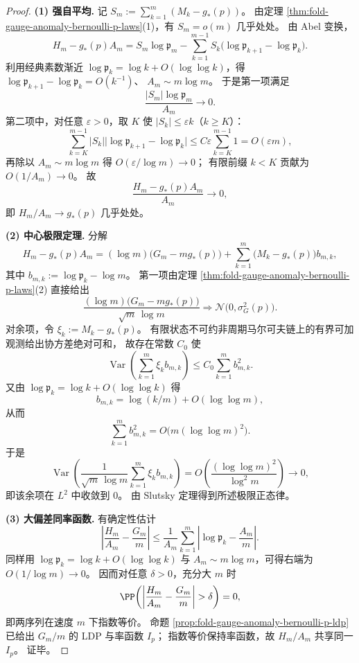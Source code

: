 \begin{proof}
\textbf{(1) 强自平均.}
记
\(
S_m:=\sum_{k=1}^{m}(M_k-g_\ast(p))
\)。
由定理 \ref{thm:fold-gauge-anomaly-bernoulli-p-laws}(1)，有 \(S_m=o(m)\) 几乎处处。
由 Abel 变换，
\[
H_m-g_\ast(p)A_m
=
S_m\log\mathfrak p_m
-\sum_{k=1}^{m-1}S_k\bigl(\log\mathfrak p_{k+1}-\log\mathfrak p_k\bigr).
\]
利用经典素数渐近 \(\log\mathfrak p_k=\log k+O(\log\log k)\)，得
\(
\log\mathfrak p_{k+1}-\log\mathfrak p_k=O(k^{-1})
\)、
\(
A_m\sim m\log m
\)。
于是第一项满足
\[
\frac{|S_m|\log\mathfrak p_m}{A_m}\to 0.
\]
第二项中，对任意 \(\varepsilon>0\)，取 \(K\) 使 \(|S_k|\le \varepsilon k\)（\(k\ge K\)）：
\[
\sum_{k=K}^{m-1}|S_k|\bigl|\log\mathfrak p_{k+1}-\log\mathfrak p_k\bigr|
\le
C\varepsilon\sum_{k=K}^{m-1}1
=
O(\varepsilon m),
\]
再除以 \(A_m\sim m\log m\) 得 \(O(\varepsilon/\log m)\to0\)；
有限前缀 \(k<K\) 贡献为 \(O(1/A_m)\to0\)。
故
\[
\frac{H_m-g_\ast(p)A_m}{A_m}\to0,
\]
即 \(H_m/A_m\to g_\ast(p)\) 几乎处处。
\par
\textbf{(2) 中心极限定理.}
分解
\[
H_m-g_\ast(p)A_m
=
(\log m)\bigl(G_m-mg_\ast(p)\bigr)
+\sum_{k=1}^{m}\bigl(M_k-g_\ast(p)\bigr)b_{m,k},
\]
其中
\(
b_{m,k}:=\log\mathfrak p_k-\log m
\)。
第一项由定理 \ref{thm:fold-gauge-anomaly-bernoulli-p-laws}(2) 直接给出
\[
\frac{(\log m)\bigl(G_m-mg_\ast(p)\bigr)}{\sqrt m\,\log m}
\Rightarrow
\mathcal N\!\bigl(0,\sigma_G^2(p)\bigr).
\]
对余项，令 \(\xi_k:=M_k-g_\ast(p)\)。
有限状态不可约非周期马尔可夫链上的有界可加观测给出协方差绝对可和，
故存在常数 \(C_0\) 使
\[
\operatorname{Var}\!\left(\sum_{k=1}^{m}\xi_k b_{m,k}\right)
\le
C_0\sum_{k=1}^{m}b_{m,k}^2.
\]
又由 \(\log\mathfrak p_k=\log k+O(\log\log k)\) 得
\[
b_{m,k}=\log(k/m)+O(\log\log m),
\]
从而
\[
\sum_{k=1}^{m}b_{m,k}^2=O\!\bigl(m(\log\log m)^2\bigr).
\]
于是
\[
\operatorname{Var}\!\left(
\frac{1}{\sqrt m\,\log m}\sum_{k=1}^{m}\xi_k b_{m,k}
\right)
=
O\!\left(\frac{(\log\log m)^2}{\log^2 m}\right)\to0,
\]
即该余项在 \(L^2\) 中收敛到 \(0\)。
由 Slutsky 定理得到所述极限正态律。
\par
\textbf{(3) 大偏差同率函数.}
有确定性估计
\[
\left|\frac{H_m}{A_m}-\frac{G_m}{m}\right|
\le
\frac{1}{A_m}\sum_{k=1}^{m}\left|\log\mathfrak p_k-\frac{A_m}{m}\right|.
\]
同样用 \(\log\mathfrak p_k=\log k+O(\log\log k)\) 与 \(A_m\sim m\log m\)，可得右端为
\(
O(1/\log m)\to0
\)。
因而对任意 \(\delta>0\)，充分大 \(m\) 时
\[
\PP\!\left(\left|\frac{H_m}{A_m}-\frac{G_m}{m}\right|>\delta\right)=0,
\]
即两序列在速度 \(m\) 下指数等价。
命题 \ref{prop:fold-gauge-anomaly-bernoulli-p-ldp} 已给出 \(G_m/m\) 的 LDP 与率函数 \(I_p\)；
指数等价保持率函数，故 \(H_m/A_m\) 共享同一 \(I_p\)。
证毕。
\end{proof}

